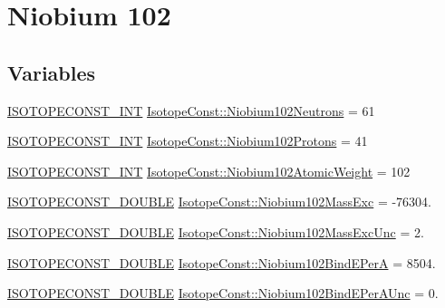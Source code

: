 \hypertarget{group___isotope_const-_niobium-_nb102}{}\section{Niobium 102}
\label{group___isotope_const-_niobium-_nb102}
\subsection*{Variables}
\begin{DoxyCompactItemize}
\item 
\mbox{\hyperlink{group___isotope_const-_macros_ga5f18360b3e99483a35c32d789e62621c}{I\+S\+O\+T\+O\+P\+E\+C\+O\+N\+S\+T\+\_\+\+I\+NT}} \mbox{\hyperlink{group___isotope_const-_niobium-_nb102_ga0698247eb19451fb162883dfd457841d}{Isotope\+Const\+::\+Niobium102\+Neutrons}} = 61
\item 
\mbox{\hyperlink{group___isotope_const-_macros_ga5f18360b3e99483a35c32d789e62621c}{I\+S\+O\+T\+O\+P\+E\+C\+O\+N\+S\+T\+\_\+\+I\+NT}} \mbox{\hyperlink{group___isotope_const-_niobium-_nb102_gaddd8841c094341ac67c6894ab869a0c3}{Isotope\+Const\+::\+Niobium102\+Protons}} = 41
\item 
\mbox{\hyperlink{group___isotope_const-_macros_ga5f18360b3e99483a35c32d789e62621c}{I\+S\+O\+T\+O\+P\+E\+C\+O\+N\+S\+T\+\_\+\+I\+NT}} \mbox{\hyperlink{group___isotope_const-_niobium-_nb102_gaa75b873e0743177c118c541f7c59befc}{Isotope\+Const\+::\+Niobium102\+Atomic\+Weight}} = 102
\item 
\mbox{\hyperlink{group___isotope_const-_macros_ga8f45a7272ce02c0b4c65c44636ed719a}{I\+S\+O\+T\+O\+P\+E\+C\+O\+N\+S\+T\+\_\+\+D\+O\+U\+B\+LE}} \mbox{\hyperlink{group___isotope_const-_niobium-_nb102_ga634a663657324eded202df357acde7ba}{Isotope\+Const\+::\+Niobium102\+Mass\+Exc}} = -\/76304.
\item 
\mbox{\hyperlink{group___isotope_const-_macros_ga8f45a7272ce02c0b4c65c44636ed719a}{I\+S\+O\+T\+O\+P\+E\+C\+O\+N\+S\+T\+\_\+\+D\+O\+U\+B\+LE}} \mbox{\hyperlink{group___isotope_const-_niobium-_nb102_ga6ea0af7cfe1a93e3fdfdc2a989186f41}{Isotope\+Const\+::\+Niobium102\+Mass\+Exc\+Unc}} = 2.
\item 
\mbox{\hyperlink{group___isotope_const-_macros_ga8f45a7272ce02c0b4c65c44636ed719a}{I\+S\+O\+T\+O\+P\+E\+C\+O\+N\+S\+T\+\_\+\+D\+O\+U\+B\+LE}} \mbox{\hyperlink{group___isotope_const-_niobium-_nb102_gafde78383018110bd7d3abddd091684e4}{Isotope\+Const\+::\+Niobium102\+Bind\+E\+PerA}} = 8504.
\item 
\mbox{\hyperlink{group___isotope_const-_macros_ga8f45a7272ce02c0b4c65c44636ed719a}{I\+S\+O\+T\+O\+P\+E\+C\+O\+N\+S\+T\+\_\+\+D\+O\+U\+B\+LE}} \mbox{\hyperlink{group___isotope_const-_niobium-_nb102_gafd07c9b1aaa913690f4fdfe5eb79a694}{Isotope\+Const\+::\+Niobium102\+Bind\+E\+Per\+A\+Unc}} = 0.

\end{DoxyCompactItemize}
